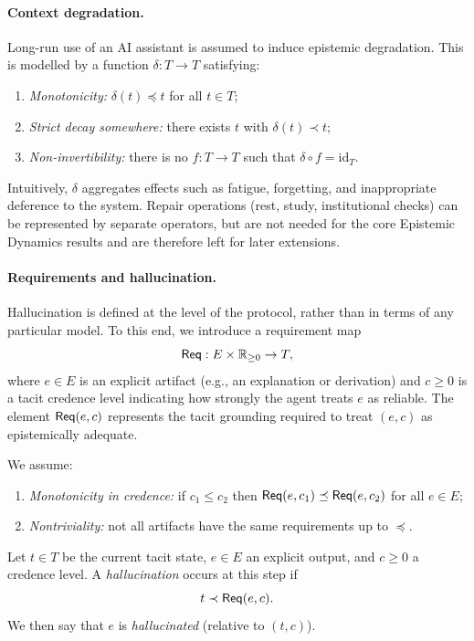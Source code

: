 \paragraph{Context degradation.}
Long-run use of an AI assistant is assumed to induce epistemic
degradation. This is modelled by a function \(\delta:T\to T\) satisfying:
\begin{enumerate}[label=(D\arabic*),leftmargin=2.2em]
  \item \emph{Monotonicity:} \(\delta(t) \preceq t\) for all \(t\in T\);
  \item \emph{Strict decay somewhere:} there exists \(t\) with
        \(\delta(t) \prec t\);
  \item \emph{Non-invertibility:} there is no \(f:T\to T\) such that
        \(\delta\circ f = \mathrm{id}_T\).
\end{enumerate}
Intuitively, \(\delta\) aggregates effects such as fatigue, forgetting,
and inappropriate deference to the system. Repair operations (rest,
study, institutional checks) can be represented by separate operators,
but are not needed for the core Epistemic Dynamics results and are therefore left
for later extensions.

\paragraph{Requirements and hallucination.}
Hallucination is defined at the level of the protocol, rather than in
terms of any particular model. To this end, we introduce a requirement
map
\[
\mathsf{Req} : E \times \mathbb{R}_{\ge 0} \to T,
\]
where \(e\in E\) is an explicit artifact (e.g., an explanation or
derivation) and \(c\ge 0\) is a tacit credence level indicating how
strongly the agent treats \(e\) as reliable. The element \(\mathsf{Req}(e,c)\)
represents the tacit grounding required to treat \((e,c)\) as
epistemically adequate.

We assume:
\begin{enumerate}[label=(R\arabic*),leftmargin=2.2em]
  \item \emph{Monotonicity in credence:} if \(c_1 \le c_2\) then
        \(\mathsf{Req}(e,c_1) \preceq \mathsf{Req}(e,c_2)\) for all \(e\in E\);
  \item \emph{Nontriviality:} not all artifacts have the same
        requirements up to \(\preceq\).
\end{enumerate}

\begin{definition}[Hallucination]
Let \(t\in T\) be the current tacit state, \(e\in E\) an explicit output,
and \(c\ge 0\) a credence level. A \emph{hallucination} occurs at this
step if
\[
t \prec \mathsf{Req}(e,c).
\]
We then say that \(e\) is \emph{hallucinated} (relative to \((t,c)\)).
\end{definition}

